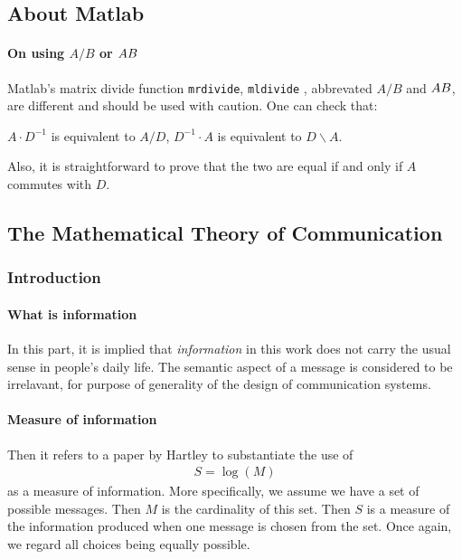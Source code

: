 \subsection{About Matlab}
\label{sec:About-Matlab}
\paragraph{On using $A/B$ or $A\\B$}
Matlab's matrix divide function \texttt{mrdivide}, \texttt{mldivide}
, abbrevated $A/B$ and $A\\B$, are different and should be used with
caution. One can check that:
\begin{center}
    $A\cdot D^{-1}$ is equivalent to $A/D$, $D^{-1}\cdot A$ is
    equivalent to $D\backslash A$.
\end{center}
Also, it is straightforward to prove that the two are equal if and only if $A$ commutes with $D$.

\subsection{The Mathematical Theory of Communication}
\label{sec:The_Mathematical_Theory_of_Communication}
\subsubsection{Introduction}

\paragraph{What is information}
In this part, it is implied that \textit{information} in this work
does not carry the usual sense in people's daily life. The semantic
aspect of a message is considered to be irrelavant, for purpose
of generality of the design of communication systems.

\paragraph{Measure of information} 

Then it refers to a paper by Hartley to substantiate the use of
\begin{align}
\label{eq:measure_of_information}
S = \log(M)
\end{align}
as a measure of information. More specifically, we assume we have a
set of possible messages. Then $M$ is the cardinality of this set.
Then $S$ is a measure of the information produced when one message
is chosen from the set. Once again, we regard all choices 
being equally possible.

